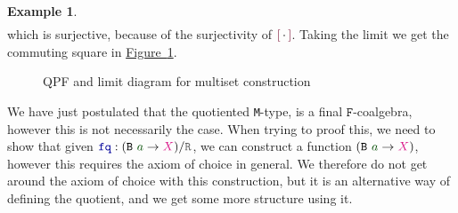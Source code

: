 \documentclass[twoside,11pt,openright]{report}
\theoremstyle{plain} %
\theoremstyle{definition}
\newtheorem{exmp}{Example} %
\theoremstyle{remark}
\newcommand*{\figref}[1]{\hyperref[fig:#1]{Figure~\ref*{fig:#1}}}
\newcommand*{\term}[1]{\textcolor{green!30!black}{#1}} %
\newcommand*{\type}[1]{\textcolor{magenta!90!black}{#1}}
\newcommand*{\relation}[1]{\textcolor{gray!75!black}{\ensuremath{\mathtt{#1}}}}
\newcommand*{\function}[1]{\textcolor{blue!60!black}{\ensuremath{\mathtt{#1}}}}
\newcommand*{\constructor}[1]{\textcolor{purple!60!black}{\ensuremath{\mathtt{#1}}}}
\newcommand*{\typeformer}[1]{\ensuremath{\mathtt{#1}}}
\newcommand*{\functor}[1]{\ensuremath{\mathbf{\mathtt{#1}}}}
\newcommand*{\quotientconstructor}[1]{\constructor{[}\,#1\,\constructor{]}}
\begin{document}
\begin{exmp}
\begin{equation}
\begin{aligned}
    \end{aligned}
  \end{equation}
  which is surjective, because of the surjectivity of \(\quotientconstructor{{\cdot}}\). Taking the limit we get the commuting square in \figref{QPF-limit-multiset}.
  \begin{figure}[h]
  \centering
  \caption{QPF and limit diagram for multiset construction}
  \label{fig:QPF-limit-multiset}
\end{figure}
\end{exmp}
\noindent We have just postulated that the quotiented \texttt{M}-type, is a final \(\functor{F}\)-coalgebra, however this is not necessarily the case. When trying to proof this, we need to show that given \(\function{fq} : (\typeformer{B}~\term{a} \rightarrow \type{X}) / \relation{R}\), we can construct a function \((\typeformer{B}~\term{a} \rightarrow \type{X})\), however this requires the axiom of choice in general. We therefore do not get around the axiom of choice with this construction, but it is an alternative way of defining the quotient, and we get some more structure using it.
\end{document}
